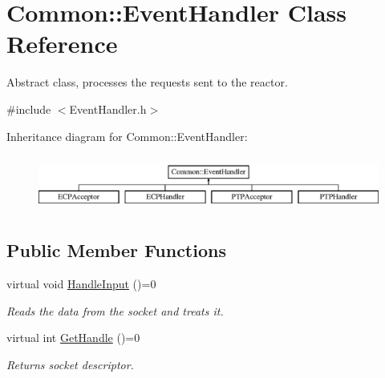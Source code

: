 \hypertarget{class_common_1_1_event_handler}{\section{Common\-:\-:Event\-Handler Class Reference}
\label{class_common_1_1_event_handler}
}


Abstract class, processes the requests sent to the reactor.  




{\ttfamily \#include $<$Event\-Handler.\-h$>$}

Inheritance diagram for Common\-:\-:Event\-Handler\-:\begin{figure}[H]
\begin{center}
\leavevmode
\includegraphics[height=1.854305cm]{class_common_1_1_event_handler}
\end{center}
\end{figure}
\subsection*{Public Member Functions}
\begin{DoxyCompactItemize}
\item 
\hypertarget{class_common_1_1_event_handler_a82426b7867c0a2fda62ab4c159cd24be}{virtual void \hyperlink{class_common_1_1_event_handler_a82426b7867c0a2fda62ab4c159cd24be}{Handle\-Input} ()=0}\label{class_common_1_1_event_handler_a82426b7867c0a2fda62ab4c159cd24be}

\begin{DoxyCompactList}\small\item\em Reads the data from the socket and treats it. \end{DoxyCompactList}\item 
\hypertarget{class_common_1_1_event_handler_aaf6cb56038c6fe6b91c9d1e34ee6b3af}{virtual int \hyperlink{class_common_1_1_event_handler_aaf6cb56038c6fe6b91c9d1e34ee6b3af}{Get\-Handle} ()=0}\label{class_common_1_1_event_handler_aaf6cb56038c6fe6b91c9d1e34ee6b3af}

\begin{DoxyCompactList}\small\item\em Returns socket descriptor. \end{DoxyCompactList}\end{DoxyCompactItemize}


